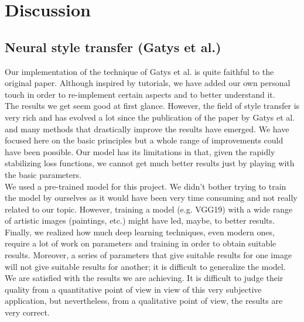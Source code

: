 \documentclass[twocolumn,superscriptaddress,aps, floatfix]{revtex4-1}
\begin{document}
    \section{Discussion}\label{discussion}
    
    \subsection{Neural style transfer (Gatys et al.)}
    
    Our implementation of the technique of Gatys et al. is quite faithful to the original paper. Although inspired by tutorials, we have added our own personal touch in order to re-implement certain aspects and to better understand it.\\
    
    The results we get seem good at first glance. However, the field of style transfer is very rich and has evolved a lot since the publication of the paper by Gatys et al. \cite{DBLP:journals/corr/GatysEB15a} and many methods that drastically improve the results have emerged. We have focused here on the basic principles but a whole range of improvements could have been possible. Our model has its limitations in that, given the rapidly stabilizing loss functions, we cannot get much better results just by playing with the basic parameters.\\
    
    We used a pre-trained model for this project. We didn't bother trying to train the model by ourselves as it would have been very time consuming and not really related to our topic. However, training a model (e.g. VGG19) with a wide range of artistic images (paintings, etc.) might have led, maybe, to better results.\\
    
    Finally, we realized how much deep learning techniques, even modern ones, require a lot of work on parameters and training in order to obtain suitable results. Moreover, a series of parameters that give suitable results for one image will not give suitable results for another; it is difficult to generalize the model.\\
    
    We are satisfied with the results we are achieving. It is difficult to judge their quality from a quantitative point of view in view of this very subjective application, but nevertheless, from a qualitative point of view, the results are very correct.
    
    
    
    \newpage
    
    
    
    \nocite{*}
\end{document}
